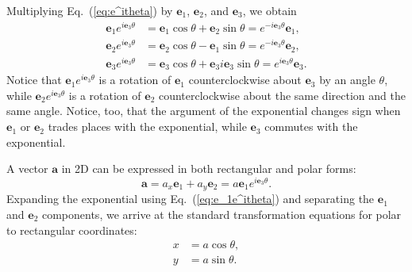 \documentclass[twocolumn,showpacs,preprintnumbers,amsmath,amssymb]{revtex4}
\begin{document}
Multiplying Eq.~(\ref{eq:e^itheta}) by $\mathbf e_1$, $\mathbf e_2$, and $\mathbf e_3$, we obtain
\begin{subequations}
\begin{align}
\label{eq:e_1e^itheta}
\mathbf{e}_1e^{ i \mathbf e_3  \theta }&= \mathbf{e}_{1}\cos\theta +\mathbf{e}_2\sin\theta = e^{- i \mathbf e_3  \theta }\mathbf{e}_1, \\
\label{eq:e_2e^itheta}
\mathbf{e}_2e^{ i \mathbf e_3  \theta }&= \mathbf{e}_{2}\cos\theta -\mathbf{e}_1\sin\theta = e^{- i \mathbf e_3  \theta }\mathbf{e}_2, \\
\mathbf{e}_3e^{ i \mathbf e_3  \theta }&= \mathbf{e}_{3}\cos\theta +\mathbf{e}_3  i \mathbf e_3 \sin\theta = e^{ i \mathbf e_3  \theta }\mathbf{e}_3 .
\end{align}
\end{subequations}
 Notice that $\mathbf{e}_1 e^{ i \mathbf e_3  \theta }$ is a rotation of $\mathbf{e}_1$ counterclockwise about $\mathbf{e}_3$ by an angle $\theta$, while  $\mathbf{e}_2 e^{ i \mathbf e_3  \theta }$ is a rotation of $\mathbf{e}_2$ counterclockwise about the same direction and the same angle. Notice, too, that the argument of the exponential changes sign when $\mathbf{e}_1$ or $\mathbf{e}_2$ trades places with the exponential, while $\mathbf{e}_3$ commutes with the exponential.

A vector $\mathbf a$ in 2D can be expressed in both rectangular and polar forms:
\begin{equation}
\label{eq:a is xe_1 + ye_2}
\mathbf a = a_x\mathbf e_1 + a_y\mathbf e_2  = a\mathbf e_1 e^{ i \mathbf e_3 \theta}.
\end{equation}
Expanding the exponential using Eq.~(\ref{eq:e_1e^itheta}) and separating the $\mathbf e_1$ and $\mathbf e_2$ components, we arrive at the standard transformation equations for polar to rectangular coordinates:
\begin{subequations}
\begin{align}
x &= a\cos\theta,\\
y &= a\sin\theta.
\end{align}
\end{subequations}
\end{document}

